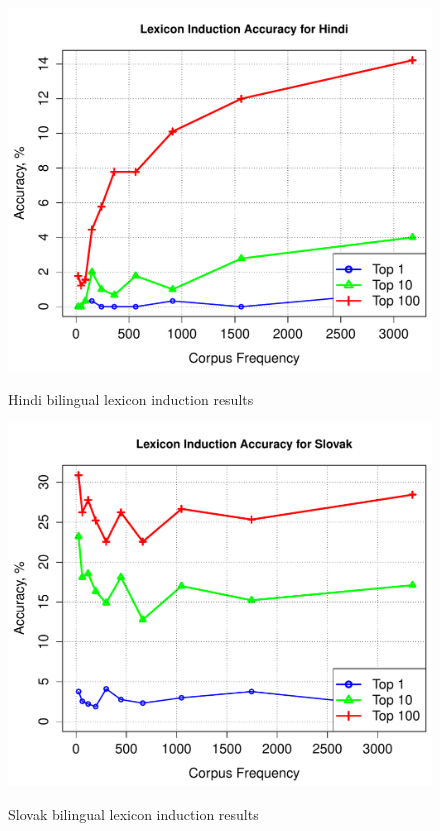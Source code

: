 \documentclass[11pt]{article}
\begin{document}
\clearpage


\begin{figure}
\vskip 0.0in
\begin{center}
\includegraphics[width=0.9 \linewidth]{../byFreqGraphs/hi/lexinductnew.pdf}
\vskip -0.15in
\caption{Hindi bilingual lexicon induction results}
\vskip -0.2in
\label{fig:bli.hi} 
\end{center}
\end{figure}



\begin{figure}
\vskip 0.0in
\begin{center}
\includegraphics[width=0.9 \linewidth]{../byFreqGraphs/sk/lexinductnew.pdf}
\vskip -0.15in
\caption{Slovak bilingual lexicon induction results}
\vskip -0.2in
\label{fig:bli.sk} 
\end{center}
\end{figure}
\end{document}
